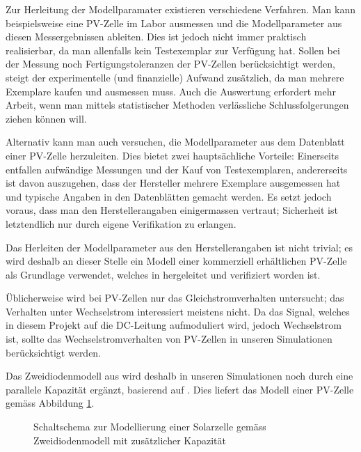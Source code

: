 Zur Herleitung der Modellparamater existieren verschiedene Verfahren. Man kann
beispielsweise eine  PV-Zelle im Labor  ausmessen und die  Modellparameter aus
diesen  Messergebnissen  ableiten.   Dies  ist jedoch  nicht  immer  praktisch
realisierbar, da man allenfalls kein Testexemplar zur Verf\"ugung hat.  Sollen
bei  der  Messung  noch Fertigungstoleranzen  der  PV-Zellen  ber\"ucksichtigt
werden,  steigt der  experimentelle  (und  finanzielle) Aufwand  zus\"atzlich,
da  man  mehrere Exemplare  kaufen  und  ausmessen muss. Auch  die  Auswertung
erfordert mehr Arbeit, wenn  man mittels statistischer Methoden verl\"assliche
Schlussfolgerungen ziehen k\"onnen will.

Alternativ   kann   man   auch   versuchen,  die   Modellparameter   aus   dem
Datenblatt  einer  PV-Zelle  herzuleiten. Dies  bietet  zwei  haupts\"achliche
Vorteile: Einerseits  entfallen  aufw\"andige  Messungen   und  der  Kauf  von
Testexemplaren, andererseits ist davon auszugehen, dass der Hersteller mehrere
Exemplare ausgemessen hat  und typische Angaben in  den Datenbl\"atten gemacht
werden.  Es setzt jedoch voraus,  dass man den Herstellerangaben einigermassen
vertraut;  Sicherheit  ist  letztendlich  nur  durch  eigene  Verifikation  zu
erlangen.

Das Herleiten der Modellparameter aus den Herstellerangaben ist nicht trivial;
es wird deshalb  an dieser Stelle ein Modell  einer kommerziell erh\"altlichen
PV-Zelle    als  Grundlage  verwendet,   welches  in
\cite{pvcell:masmoudi} hergeleitet und verifiziert worden ist.

\"Ublicherweise wird  bei PV-Zellen  nur das  Gleichstromverhalten untersucht;
das Verhalten  unter Wechselstrom interessiert meistens  nicht. Da das Signal,
welches  in  diesem  Projekt  auf die  DC-Leitung  aufmoduliert  wird,  jedoch
Wechselstrom ist,  sollte das  Wechselstromverhalten von PV-Zellen  in unseren
Simulationen ber\"ucksichtigt werden.

Das  Zweidiodenmodell  aus  \cite{pvcell:masmoudi}  wird  deshalb  in  unseren
Simulationen noch  durch eine  parallele Kapazit\"at erg\"anzt,  basierend auf
\cite{ref:solar:scofield}. Dies  liefert das  Modell  einer PV-Zelle  gem\"ass
Abbildung \ref{fig:circuit:solarCell}.

\begin{figure}[h!tb]
    \centering
    
    \caption{%
        Schaltschema    zur    Modellierung    einer    Solarzelle    gem\"ass
        Zweidiodenmodell mit zus\"atzlicher Kapazit\"at%
    }
    \label{fig:circuit:solarCell}
\end{figure}


